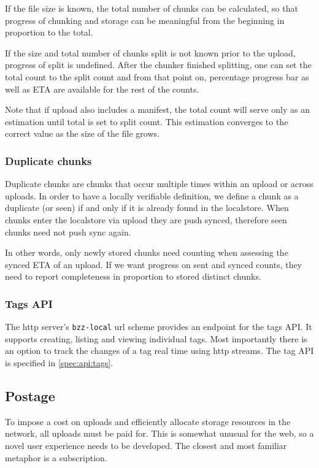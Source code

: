 If the file size is known, the total number of chunks can be calculated, so that progress of chunking and storage can be meaningful from the beginning in proportion to the total.

If the size and total number of chunks split is not known prior to the upload, progress of split is undefined. After the chunker finished splitting, one can set the total count to the split count and from that point on, percentage progress bar as well as ETA are available for the rest of the counts.

Note that if upload also includes a manifest, the total count will serve only as an estimation until total is set to split count. This estimation converges to the correct value as the  size of the file grows.


\subsubsection{Duplicate chunks}

Duplicate chunks are chunks that occur multiple times within an upload or across uploads. In order to have a locally verifiable definition, we define a chunk as a duplicate (or seen) if and only if it is already found in the localstore.
When chunks enter the localstore via upload they are push synced, therefore seen chunks need not push sync again.

In other words, only newly stored chunks need counting when assessing the synced ETA of an upload. If we want progress on sent and synced counts, they need to report completeness in proportion to stored distinct chunks.

\subsubsection{Tags API} 

The http server's \texttt{bzz-local} url scheme provides an endpoint for the tags API. It supports creating, listing and viewing individual tags. Most importantly there is an option to track the changes of a tag real time using http streams. The tag API is specified in \ref{spec:api:tags}.



\subsection{Postage}\label{sec:postage-ux}

To impose a cost on uploads and efficiently allocate storage resources in the network, all uploads must be paid for.  This is somewhat unusual for the web, so a novel user experience needs to be developed. The closest and most familiar metaphor is a subscription.

